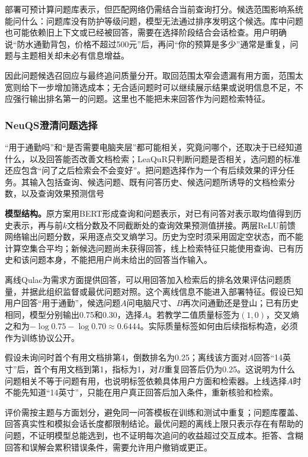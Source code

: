 部署可预计算问题库表示，但匹配网络仍需结合当前查询打分。候选范围影响系统能问什么：问题库没有防护等级问题，模型无法通过排序发明这个候选。库中问题也可能依赖旧上下文或已经被回答，需要在选择阶段结合会话检查。用户明确说“防水通勤背包，价格不超过500元”后，再问“你的预算是多少”通常是重复，问题与主题相关却未必有信息增益。

因此问题候选召回应与最终追问质量分开。取回范围太窄会遗漏有用方面，范围太宽则给下一步增加筛选成本；无合适问题时可以继续展示结果或说明信息不足，不应强行输出排名第一的问题。这里也不能把未来回答作为问题检索特征。

\Needspace{100mm}
\subsubsection{NeuQS澄清问题选择}
\label{sec:rs-search-neuqs}

“用于通勤吗”和“是否需要电脑夹层”都可能相关，究竟问哪个，还取决于已经知道什么，以及回答能否改善文档检索；LeaQuR只判断问题是否相关，选问题的标准还应包含“问了之后检索会不会变好”。把问题选择作为一个有后续效果的评分任务。其输入包括查询、候选问题、既有问答历史、候选问题所诱导的文档检索分数，以及查询效果预测信号

\textbf{模型结构。}原方案用BERT形成查询和问题表示，对已有问答对表示取均值得到历史表示，再与前$k$文档分数及不同截断处的查询效果预测值拼接。两层ReLU前馈网络输出问题分数，采用逐点交叉熵学习。历史为空时须采用固定空状态，而不能计算空集合平均；新候选问题尚未获得回答，线上检索特征只能使用查询、已有历史和该问题本身，不能把用户尚未给出的回答当作输入。

离线Qulac为需求方面提供回答，可以用回答加入检索后的排名效果评估问题质量，并据此组织监督或最优问题对照。这个离线信息不能进入部署特征。假设已知用户回答“用于通勤”，候选问题$A$问电脑尺寸、$B$再次问通勤还是登山；已有历史相同，模型分别输出0.75和0.30，选择$A$。若教学二值质量标签为$(1,0)$，交叉熵之和为$-\log0.75-\log0.70\approx0.6444$。实际质量标签如何由后续指标构造，必须作为训练协议公开。

假设未询问时首个有用文档排第4，倒数排名为0.25；离线该方面对$A$回答“14英寸”后，首个有用文档到第1，指标为1，对$B$重复回答后仍为0.25。这说明为什么问题相关不等于问题有用，也说明标签依赖具体用户方面和检索器。上线选择$A$时不能先知道“14英寸”，只能在用户真正回答后加入条件，重新核验和检索。

评价需按主题与方面划分，避免同一问答模板在训练和测试中重复；问题库覆盖、回答真实性和模拟会话长度都限制结论。最优问题的离线上限只表示存在有帮助的问题，不证明模型总能选到，也不证明每次追问的收益超过交互成本。拒答、含糊回答和误解会累积错误条件，需要允许用户撤销或更正。


